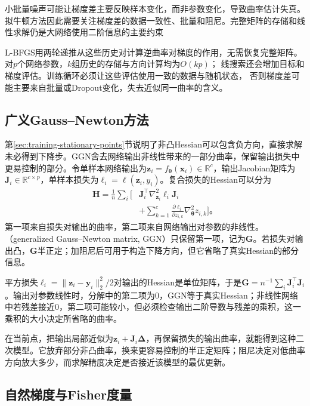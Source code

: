 小批量噪声可能让梯度差主要反映样本变化，而非参数变化，导致曲率估计失真。拟牛顿方法因此需要关注梯度差的数据一致性、批量和阻尼。完整矩阵的存储和线性求解仍是大网络使用二阶信息的主要约束

L-BFGS用两轮递推从这些历史对计算逆曲率对梯度的作用，无需恢复完整矩阵。
对$p$个网络参数，$k$组历史的存储与方向计算均为$O(kp)$；
线搜索还会增加目标和梯度评估。训练循环必须让这些评估使用一致的数据与随机状态，
否则梯度差可能主要来自批量或Dropout变化，失去近似同一曲率的含义。

\subsection{广义Gauss--Newton方法}
\label{sec:training-generalized-curvature}

第\ref{sec:training-stationary-points}节说明了非凸Hessian可以包含负方向，直接求解未必得到下降步。GGN舍去网络输出非线性带来的一部分曲率，保留输出损失中更易控制的部分。令单样本网络输出为$\bm z_i=f_{\bm\theta}(\bm x_i)\in\mathbb R^c$，输出Jacobian矩阵为$\bm J_i\in\mathbb R^{c\times p}$，单样本损失为$\ell_i=\ell(\bm z_i,y_i)$。复合损失的Hessian可以分为
\begin{equation}
  \begin{aligned}
  \bm H=\frac1n\sum_i\bigg[
    &\bm J_i^{\top}\nabla_{\bm z_i}^2\ell_i\bm J_i\\
    &+\sum_{k=1}^c\frac{\partial\ell_i}{\partial z_{i,k}}
         \nabla_{\bm\theta}^2z_{i,k}\bigg]\text{。}
  \end{aligned}
  \label{eq:training-hessian-decomposition}
\end{equation}
第一项来自损失对输出的曲率，第二项来自网络输出对参数的非线性。（generalized Gauss--Newton matrix, GGN）只保留第一项，记为$\bm G$。若损失对输出凸，$\bm G$半正定；加阻尼后可用于构造下降方向，但它省略了真实Hessian的部分信息。

平方损失$\ell_i=\lVert\bm z_i-\bm y_i\rVert_2^2/2$对输出的Hessian是单位矩阵，于是$\bm G=n^{-1}\sum_i\bm J_i^{\top}\bm J_i$。输出对参数线性时，分解中的第二项为0，GGN等于真实Hessian；非线性网络中若残差接近0，第二项可能较小，但必须检查输出二阶导数与残差的乘积，这一乘积的大小决定所省略的曲率。

在当前点，把输出局部近似为$\bm z_i+\bm J_i\bm\Delta$，再保留损失的输出曲率，就能得到这种二次模型。它放弃部分非凸曲率，换来更容易控制的半正定矩阵；阻尼决定对低曲率方向放大多少，而求解精度决定是否接近该模型的最优更新。

\subsection{自然梯度与Fisher度量}
\label{sec:training-natural-gradient}

